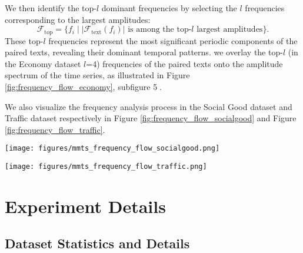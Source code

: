 We then identify the top-$l$ dominant frequencies by selecting the $l$ frequencies corresponding to the largest amplitudes:
\begin{equation}
\mathcal{F}_{\text{top}} = \{f_i \mid |\mathcal{F}_{\text{text}}(f_i)| \text{ is among the top-} l \text{ largest amplitudes}\}.
\end{equation}
These top-$l$ frequencies represent the most significant periodic components of the paired texts, revealing their dominant temporal patterns. we overlay the top-$l$ (in the Economy dataset $l$=4) frequencies of the paired texts onto the amplitude spectrum of the time series, as illustrated in Figure \ref{fig:frequency_flow_economy}, subfigure \textcircled{5}.

We also visualize the frequency analysis process in the Social Good dataset and Traffic dataset respectively in Figure \ref{fig:frequency_flow_socialgood} and Figure \ref{fig:frequency_flow_traffic}.


\begin{figure*}[h]
    \centering
    \texttt{[image: figures/mmts\_frequency\_flow\_socialgood.png]}
    \caption{Illustration of the frequency analysis process for time series with paired texts in the Social Good dataset. In Step \textcircled{5}, we overlay the top-$9$ frequencies of paired texts onto the time series amplitude spectrum.}
    \label{fig:frequency_flow_socialgood}
\end{figure*}


\begin{figure*}[h]
    \centering
    \texttt{[image: figures/mmts\_frequency\_flow\_traffic.png]}
    \caption{Illustration of the frequency analysis process for time series with paired texts in the Traffic dataset. In Step \textcircled{5}, we overlay the top-$7$ frequencies of paired texts onto the time series amplitude spectrum.}
    \label{fig:frequency_flow_traffic}
\end{figure*}




\section{Experiment Details}
\label{ap: exp details}

\subsection{Dataset Statistics and Details}
\label{ap: dataset details}

